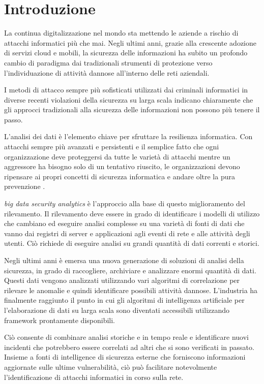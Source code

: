 \documentclass[../main.tex]{subfiles}
\begin{document}
\chapter{Introduzione}

La continua digitalizzazione nel mondo sta mettendo le aziende a rischio di attacchi informatici più che mai. Negli ultimi anni, grazie alla crescente adozione di servizi cloud e mobili, la sicurezza delle informazioni ha subito un profondo cambio di paradigma dai tradizionali strumenti di protezione verso l'individuazione di attività dannose all'interno delle reti aziendali.

I metodi di attacco sempre più sofisticati utilizzati dai criminali informatici in diverse recenti violazioni della sicurezza su larga scala indicano chiaramente che gli approcci tradizionali alla sicurezza delle informazioni non possono più tenere il passo. 

L'analisi dei dati è l'elemento chiave per sfruttare la resilienza informatica. Con attacchi sempre più avanzati e persistenti e il semplice fatto che ogni organizzazione deve proteggersi da tutte le varietà di attacchi mentre un aggressore ha bisogno solo di un tentativo riuscito, le organizzazioni devono ripensare ai propri concetti di sicurezza informatica e andare oltre la pura prevenzione \cite{bigdata}.

\textit{big data security analytics} è l'approccio alla base di questo miglioramento del rilevamento. Il rilevamento deve essere in grado di identificare i modelli di utilizzo che cambiano ed eseguire analisi complesse su una varietà di fonti di dati che vanno dai registri di server e applicazioni agli eventi di rete e alle attività degli utenti.
Ciò richiede di eseguire analisi su grandi quantità di dati correnti e storici.

Negli ultimi anni è emersa una nuova generazione di soluzioni di analisi della sicurezza, in grado di raccogliere, archiviare e analizzare enormi quantità di dati. Questi dati vengono analizzati utilizzando vari algoritmi di correlazione per rilevare le anomalie e quindi identificare possibili attività dannose.
L'industria ha finalmente raggiunto il punto in cui gli algoritmi di intelligenza artificiale per l'elaborazione di dati su larga scala sono diventati accessibili utilizzando framework prontamente disponibili.

Ciò consente di combinare analisi storiche e in tempo reale e identificare nuovi incidenti che potrebbero essere correlati ad altri che si sono verificati in passato. Insieme a fonti di intelligence di sicurezza esterne che forniscono informazioni aggiornate sulle ultime vulnerabilità, ciò può facilitare notevolmente l'identificazione di attacchi informatici in corso sulla rete.
\end{document}
